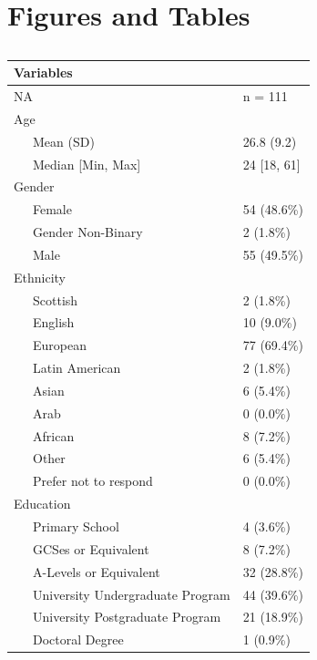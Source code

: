 \documentclass[
  english,
  man]{apa6}
\begin{document}
\endgroup

\newpage

\hypertarget{figures-and-tables}{%
\section{Figures and Tables}\label{figures-and-tables}}

\begin{table}[tbp]

\begin{center}
\begin{threeparttable}

\caption{\label{tab:unnamed-chunk-1}}

\begin{tabular}{ll}
\toprule
Variables & \\
\midrule
NA & n = 111\\
Age & \\
\ \ \ Mean (SD) & 26.8 (9.2)\\
\ \ \ Median [Min, Max] & 24 [18, 61]\\
Gender & \\
\ \ \ Female & 54 (48.6\%)\\
\ \ \ Gender Non-Binary & 2 (1.8\%)\\
\ \ \ Male & 55 (49.5\%)\\
Ethnicity & \\
\ \ \ Scottish & 2 (1.8\%)\\
\ \ \ English & 10 (9.0\%)\\
\ \ \ European & 77 (69.4\%)\\
\ \ \ Latin American & 2 (1.8\%)\\
\ \ \ Asian & 6 (5.4\%)\\
\ \ \ Arab & 0 (0.0\%)\\
\ \ \ African & 8 (7.2\%)\\
\ \ \ Other & 6 (5.4\%)\\
\ \ \ Prefer not to respond & 0 (0.0\%)\\
Education & \\
\ \ \ Primary School & 4 (3.6\%)\\
\ \ \ GCSes or Equivalent & 8 (7.2\%)\\
\ \ \ A-Levels or Equivalent & 32 (28.8\%)\\
\ \ \ University Undergraduate Program & 44 (39.6\%)\\
\ \ \ University Postgraduate Program & 21 (18.9\%)\\
\ \ \ Doctoral Degree & 1 (0.9\%)\\
\bottomrule
\end{tabular}

\end{threeparttable}
\end{center}

\end{table}
\end{document}
